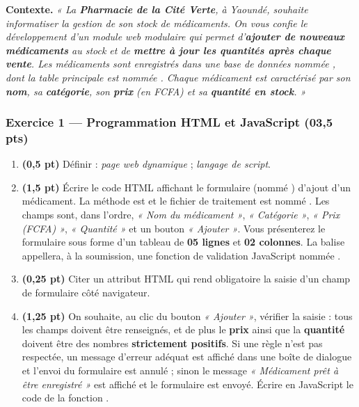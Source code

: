 \noindent\textbf{Contexte.} \emph{« La \textbf{Pharmacie de la Cité Verte}, à Yaoundé,
souhaite informatiser la gestion de son stock de médicaments. On vous confie le
développement d'un module web modulaire qui permet d'\textbf{ajouter de nouveaux
médicaments} au stock et de \textbf{mettre à jour les quantités après chaque vente}.
Les médicaments sont enregistrés dans une base de données nommée ,
dont la table principale est nommée . Chaque médicament est
caractérisé par son \textbf{nom}, sa \textbf{catégorie}, son \textbf{prix} (en FCFA)
et sa \textbf{quantité en stock}. »}

\subsubsection*{Exercice 1 — Programmation HTML et JavaScript \hfill (03,5 pts)}

\begin{enumerate}[label=\textbf{\arabic*.}]
\item \textbf{(0,5 pt)} Définir : \emph{page web dynamique} ; \emph{langage de script}.
\item \textbf{(1,5 pt)} Écrire le code HTML affichant le formulaire (nommé
) d'ajout d'un médicament. La méthode est  et le fichier de
traitement est nommé . Les champs sont, dans l'ordre,
\emph{« Nom du médicament »}, \emph{« Catégorie »}, \emph{« Prix (FCFA) »},
\emph{« Quantité »} et un bouton \emph{« Ajouter »}. Vous présenterez le formulaire
sous forme d'un tableau de \textbf{05 lignes} et \textbf{02 colonnes}. La balise
 appellera, à la soumission, une fonction de validation JavaScript
nommée .
\item \textbf{(0,25 pt)} Citer un attribut HTML qui rend obligatoire la saisie d'un
champ de formulaire côté navigateur.
\item \textbf{(1,25 pt)} On souhaite, au clic du bouton \emph{« Ajouter »}, vérifier
la saisie : tous les champs doivent être renseignés, et de plus le \textbf{prix} ainsi
que la \textbf{quantité} doivent être des nombres \textbf{strictement positifs}. Si une
règle n'est pas respectée, un message d'erreur adéquat est affiché dans une boîte de
dialogue et l'envoi du formulaire est annulé ; sinon le message
\emph{« Médicament prêt à être enregistré »} est affiché et le formulaire est envoyé.
Écrire en JavaScript le code de la fonction .
\end{enumerate}

